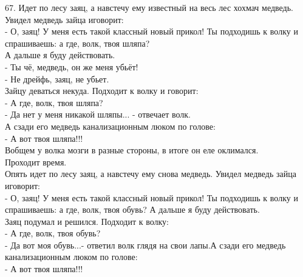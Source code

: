 \documentclass[a4paper,20pt,notitlepage]{extbook}
\begin{document}
	67.  Идет по лесу заяц, а навстечу ему известный на весь лес хохмач медведь. Увидел медведь зайца иговорит:\\
	- О, заяц! У меня есть такой классный новый прикол! Ты подходишь к волку и спрашиваешь: а где, волк, твоя шляпа?\\
	 А дальше я буду действовать.\\
	- Ты чё, медведь, он же меня убьёт!\\
	- Не дрейфь, заяц, не убьет.\\
	Зайцу деваться некуда. Подходит к волку и говорит:\\
	- А где, волк, твоя шляпа?\\
	- Да нет у меня никакой шляпы... - отвечает волк. \\
	А сзади его медведь канализационным люком по голове:\\
	- А вот твоя шляпа!!!\\
	Вобщем у волка мозги в разные стороны, в итоге он еле оклимался.\\
	Проходит время.\\
	Опять идет по лесу заяц, а навстечу ему снова медведь. Увидел медведь зайца иговорит:\\
	- О, заяц! У меня есть такой классный новый прикол! Ты подходишь к волку и спрашиваешь: а где, волк, твоя обувь? А дальше я буду действовать.\\
	Заяц подумал и решился. Подходит к волку:\\
	- А где, волк, твоя обувь?\\
	- Да вот моя обувь...- ответил волк глядя на свои лапы.А сзади его медведь канализационным люком по голове:\\
	- А вот твоя шляпа!!!\\
	
\end{document}
